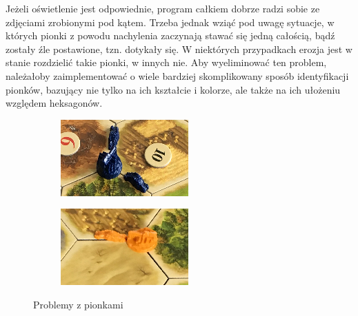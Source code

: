 \documentclass[a4paper]{article}
\begin{document}
    Jeżeli oświetlenie jest odpowiednie, program całkiem dobrze radzi sobie ze zdjęciami zrobionymi pod kątem. Trzeba jednak wziąć pod uwagę sytuacje, w których pionki z powodu nachylenia zaczynają stawać się jedną całością, bądź zostały źle postawione, tzn. dotykały się. W niektórych przypadkach erozja jest w stanie rozdzielić takie pionki, w innych nie. Aby wyeliminować ten problem, należałoby zaimplementować o wiele bardziej skomplikowany sposób identyfikacji pionków, bazujący nie tylko na ich kształcie i kolorze, ale także na ich ułożeniu względem heksagonów.
		\begin{figure}[H]
        \begin{subfigure}[]{0.5\linewidth}
        \includegraphics[width=\linewidth]{pictures/fields/angle.png}
        \end{subfigure}
        \begin{subfigure}[]{0.5\linewidth}
        \includegraphics[width=\linewidth]{pictures/fields/touch.png}
        \end{subfigure}

        \caption{Problemy z pionkami}
        \label{fig:problem_pawns}
    \end{figure}
\end{document}
